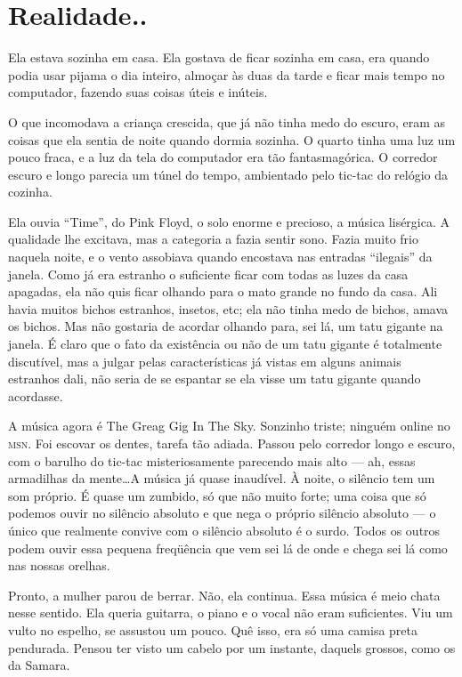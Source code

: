 \chapter{Realidade..}

Ela estava sozinha em casa. Ela gostava de ficar sozinha em casa, era quando podia usar pijama o dia inteiro, almoçar às duas da tarde e ficar mais tempo no computador, fazendo suas coisas úteis e inúteis.

O que incomodava a criança crescida, que já não tinha medo do escuro, eram as coisas que ela sentia de noite quando dormia sozinha. O quarto tinha uma luz um pouco fraca, e a luz da tela do computador era tão fantasmagórica. O corredor escuro e longo parecia um túnel do tempo, ambientado pelo tic-tac do relógio da cozinha.

Ela ouvia ``Time'', do Pink Floyd, o solo enorme e precioso, a música lisérgica. A qualidade lhe excitava, mas a categoria a fazia sentir sono. Fazia muito frio naquela noite, e o vento assobiava quando encostava nas entradas ``ilegais'' da janela. Como já era estranho o suficiente ficar com todas as luzes da casa apagadas, ela não quis ficar olhando para o mato grande no fundo da casa. Ali havia muitos bichos estranhos, insetos, etc; ela não tinha medo de bichos, amava os bichos. Mas não gostaria de acordar olhando para, sei lá, um tatu gigante na janela. É claro que o fato da existência ou não de um tatu gigante é totalmente discutível, mas a julgar pelas características já vistas em alguns animais estranhos dali, não seria de se espantar se ela visse um tatu gigante quando acordasse.

A música agora é The Greag Gig In The Sky. Sonzinho triste; ninguém online no \textsc{msn}. Foi escovar os dentes, tarefa tão adiada. Passou pelo corredor longo e escuro, com o barulho do tic-tac misteriosamente parecendo mais alto --- ah, essas armadilhas da mente\ldots A música já quase inaudível. À noite, o silêncio tem um som próprio. É quase um zumbido, só que não muito forte; uma coisa que só podemos ouvir no silêncio absoluto e que nega o próprio silêncio absoluto --- o único que realmente convive com o silêncio absoluto é o surdo. Todos os outros podem ouvir essa pequena freqüência que vem sei lá de onde e chega sei lá como nas nossas orelhas.

Pronto, a mulher parou de berrar. Não, ela continua. Essa música é meio chata nesse sentido. Ela queria guitarra, o piano e o vocal não eram suficientes. Viu um vulto no espelho, se assustou um pouco. Quê isso, era só uma camisa preta pendurada. Pensou ter visto um cabelo por um instante, daquels grossos, como os da Samara.

